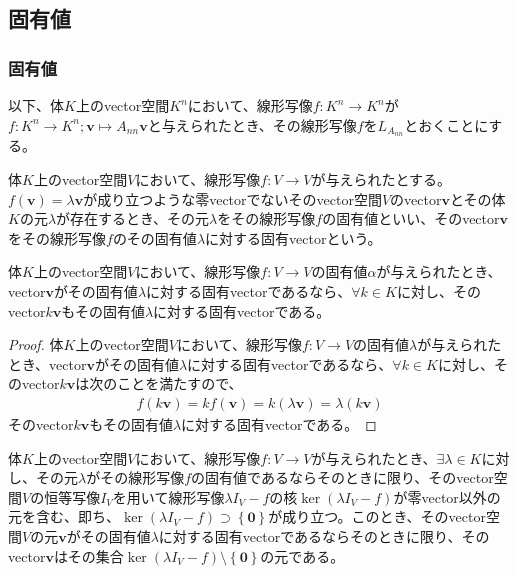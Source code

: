 \documentclass[dvipdfmx]{jsarticle}
\begin{document}
\subsection{固有値}%
\subsubsection{固有値}%
\begin{dfn}
以下、体$K$上のvector空間$K^{n}$において、線形写像$f:K^{n} \rightarrow K^{n}$が$f:K^{n} \rightarrow K^{n};\mathbf{v} \mapsto A_{nn}\mathbf{v}$と与えられたとき、その線形写像$f$を$L_{A_{nn}}$とおくことにする。
\end{dfn}
\begin{dfn}
体$K$上のvector空間$V$において、線形写像$f:V \rightarrow V$が与えられたとする。$f\left( \mathbf{v} \right) = \lambda\mathbf{v}$が成り立つような零vectorでないそのvector空間$V$のvector$\mathbf{v}$とその体$K$の元$\lambda$が存在するとき、その元$\lambda$をその線形写像$f$の固有値といい、そのvector$\mathbf{v}$をその線形写像$f$のその固有値$\lambda$に対する固有vectorという。
\end{dfn}
\begin{thm}\label{2.2.2.1}
体$K$上のvector空間$V$において、線形写像$f:V \rightarrow V$の固有値$\alpha$が与えられたとき、vector$\mathbf{v}$がその固有値$\lambda$に対する固有vectorであるなら、$\forall k \in K$に対し、そのvector$k\mathbf{v}$もその固有値$\lambda$に対する固有vectorである。
\end{thm}
\begin{proof}
体$K$上のvector空間$V$において、線形写像$f:V \rightarrow V$の固有値$\lambda$が与えられたとき、vector$\mathbf{v}$がその固有値$\lambda$に対する固有vectorであるなら、$\forall k \in K$に対し、そのvector$k\mathbf{v}$は次のことを満たすので、
\begin{align*}
f\left( k\mathbf{v} \right) = kf\left( \mathbf{v} \right) = k\left( \lambda\mathbf{v} \right) = \lambda\left( k\mathbf{v} \right)
\end{align*}
そのvector$k\mathbf{v}$もその固有値$\lambda$に対する固有vectorである。
\end{proof}
\begin{thm}\label{2.2.2.2}
体$K$上のvector空間$V$において、線形写像$f:V \rightarrow V$が与えられたとき、$\exists\lambda \in K$に対し、その元$\lambda$がその線形写像$f$の固有値であるならそのときに限り、そのvector空間$V$の恒等写像$I_{V}$を用いて線形写像$\lambda I_{V} - f$の核$\ker\left( \lambda I_{V} - f \right)$が零vector以外の元を含む、即ち、$\ker\left( \lambda I_{V} - f \right) \supset \left\{ \mathbf{0} \right\}$が成り立つ。このとき、そのvector空間$V$の元$\mathbf{v}$がその固有値$\lambda$に対する固有vectorであるならそのときに限り、そのvector$\mathbf{v}$はその集合$\ker\left( \lambda I_{V} - f \right) \setminus \left\{ \mathbf{0} \right\}$の元である。
\end{thm}
\end{document}
